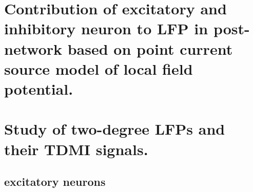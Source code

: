\documentclass{beamer}
\makeatletter
\newcommand{\tabincell}[2]{\begin{tabular}{@{}#1@{}}#2\end{tabular}}
\makeatother
\begin{document}
	\section{Contribution of excitatory and inhibitory neuron to LFP in post-network based on point current source model of local field potential.}



	\section{Study of two-degree LFPs and their TDMI signals.}



	\subsection{excitatory neurons}

						
	
	
\end{document}
